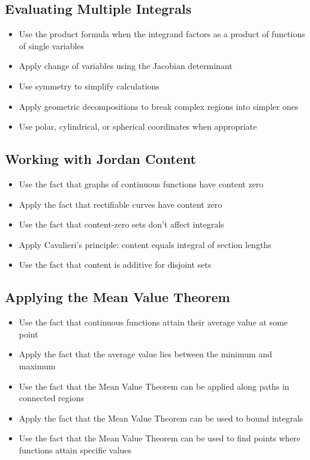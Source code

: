 \subsection*{Evaluating Multiple Integrals}
\begin{itemize}
\item Use the product formula when the integrand factors as a product of functions of single variables
\item Apply change of variables using the Jacobian determinant
\item Use symmetry to simplify calculations
\item Apply geometric decompositions to break complex regions into simpler ones
\item Use polar, cylindrical, or spherical coordinates when appropriate
\end{itemize}

\subsection*{Working with Jordan Content}
\begin{itemize}
\item Use the fact that graphs of continuous functions have content zero
\item Apply the fact that rectifiable curves have content zero
\item Use the fact that content-zero sets don't affect integrals
\item Apply Cavalieri's principle: content equals integral of section lengths
\item Use the fact that content is additive for disjoint sets
\end{itemize}

\subsection*{Applying the Mean Value Theorem}
\begin{itemize}
\item Use the fact that continuous functions attain their average value at some point
\item Apply the fact that the average value lies between the minimum and maximum
\item Use the fact that the Mean Value Theorem can be applied along paths in connected regions
\item Apply the fact that the Mean Value Theorem can be used to bound integrals
\item Use the fact that the Mean Value Theorem can be used to find points where functions attain specific values
\end{itemize}


